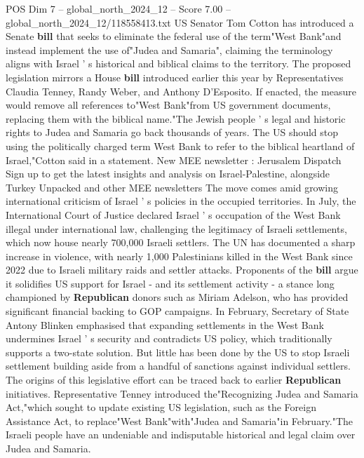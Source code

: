 \begin{textsample}{POS Dim 7 – global\_north\_2024\_12 – Score 7.00 – global\_north\_2024\_12/118558413.txt}  \label{ex:f7_pos_291}
US Senator Tom Cotton has introduced a Senate \textbf{bill} that seeks to eliminate the federal use of the term"West Bank"and instead implement the use of"Judea and Samaria", claiming the terminology aligns with Israel ' s historical and biblical claims to the territory.
The proposed legislation mirrors a House \textbf{bill} introduced earlier this year by Representatives Claudia Tenney, Randy Weber, and Anthony D'Esposito.
If enacted, the measure would remove all references to"West Bank"from US government documents, replacing them with the biblical name."The Jewish people ' s legal and historic rights to Judea and Samaria go back thousands of years.
The US should stop using the politically charged term West Bank to refer to the biblical heartland of Israel,"Cotton said in a statement.
New MEE newsletter : Jerusalem Dispatch Sign up to get the latest insights and analysis on Israel-Palestine, alongside Turkey Unpacked and other MEE newsletters The move comes amid growing international criticism of Israel ' s policies in the occupied territories.
In July, the International Court of Justice declared Israel ' s occupation of the West Bank illegal under international law, challenging the legitimacy of Israeli settlements, which now house nearly 700,000 Israeli settlers.
The UN has documented a sharp increase in violence, with nearly 1,000 Palestinians killed in the West Bank since 2022 due to Israeli military raids and settler attacks.
Proponents of the \textbf{bill} argue it solidifies US support for Israel - and its settlement activity - a stance long championed by \textbf{Republican} donors such as Miriam Adelson, who has provided significant financial backing to GOP campaigns.
In February, Secretary of State Antony Blinken emphasised that expanding settlements in the West Bank undermines Israel ' s security and contradicts US policy, which traditionally supports a two-state solution.
But little has been done by the US to stop Israeli settlement building aside from a handful of sanctions against individual settlers.
The origins of this legislative effort can be traced back to earlier \textbf{Republican} initiatives.
Representative Tenney introduced the"Recognizing Judea and Samaria Act,"which sought to update existing US legislation, such as the Foreign Assistance Act, to replace"West Bank"with"Judea and Samaria"in February."The Israeli people have an undeniable and indisputable historical and legal claim over Judea and Samaria.

\end{textsample}
